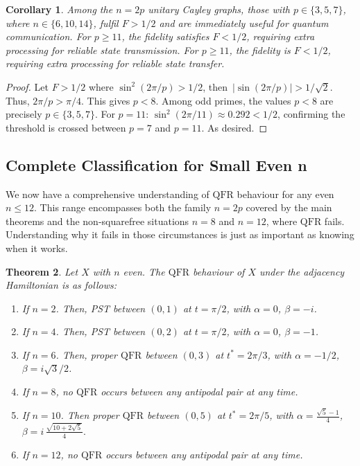 \documentclass[12pt]{amsart}
\newtheorem{theorem}{Theorem}[section]
\newtheorem{corollary}[theorem]{Corollary}
\newcommand{\QFR}{\mathrm{QFR}}
\begin{document}
\begin{corollary}\label{cor001useful}
 Among the $n = 2p$ unitary Cayley graphs, those with $p \in \{3, 5, 7\}$, where $n \in \{6, 10, 14\}$, fulfil $F > 1/2$ and are immediately useful for quantum communication. For $p \geq 11$, the fidelity satisfies $F < 1/2$, requiring extra processing for reliable state transmission. For $p \geq 11$, the fidelity is $F < 1/2$, requiring extra processing for reliable state transfer.
\end{corollary}
\begin{proof}
Let $F > 1/2$ where $\sin^2(2\pi/p) > 1/2$, then\ $|\sin(2\pi/p)| > 1/\sqrt{2}$. Thus, $2\pi/p > \pi/4$. This gives
  $p < 8$. Among odd primes, the values $p < 8$ are precisely $p \in \{3, 5, 7\}$. For
  $p = 11$: $\sin^2(2\pi/11) \approx 0.292 < 1/2$, confirming the threshold is crossed
  between $p = 7$ and $p = 11$. As desired.
\end{proof}


\subsection{Complete Classification for Small Even n}

We now have a comprehensive understanding of $\QFR$ behaviour for any even $n \leq 12$. This range encompasses both the family $n=2p$ covered by the main theorems and the non-squarefree situations $n = 8$ and $n = 12$, where $\QFR$ fails. Understanding why it fails in those circumstances is just as important as knowing when it works.

\begin{theorem}\label{Thm6classification}
 Let $X$ with $n$ even. The $\QFR$ behaviour of $X$ under the adjacency   Hamiltonian is as follows:
\begin{enumerate}
\item If $n=2$. Then,  PST between $(0,1)$ at $t = \pi/2$, with $\alpha = 0$, $\beta = -i$.

\item If $n=4$. Then, PST between $(0,2)$ at $t = \pi/2$, with $\alpha = 0$, $\beta = -1$.

\item If  $n=6$. Then, proper $\QFR$ between $(0,3)$ at $t^* = 2\pi/3$, with $\alpha = -1/2$, $\beta = i\sqrt{3}/2$.

\item If  $n=8$, no $\QFR$ occurs between any antipodal pair at any time.

\item If $n=10$. Then proper $\QFR$ between $(0,5)$ at $t^* = 2\pi/5$, with $\alpha = \frac{\sqrt{5}-1}{4}$,
          $\beta=i\,\frac{\sqrt{10+2\sqrt{5}}}{4}.$
\item If $n=12$, no $\QFR$ occurs between any antipodal pair at any time.
  \end{enumerate}
\end{theorem}
\end{document}
